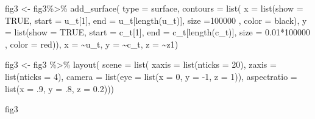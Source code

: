 \documentclass[
  us-letterpaper,
]{scrreprt}
\newenvironment{Shaded}{\begin{snugshade}}{\end{snugshade}}
\newcommand{\AttributeTok}[1]{\textcolor[rgb]{0.40,0.45,0.13}{#1}}
\newcommand{\ConstantTok}[1]{\textcolor[rgb]{0.56,0.35,0.01}{#1}}
\newcommand{\DecValTok}[1]{\textcolor[rgb]{0.68,0.00,0.00}{#1}}
\newcommand{\FloatTok}[1]{\textcolor[rgb]{0.68,0.00,0.00}{#1}}
\newcommand{\FunctionTok}[1]{\textcolor[rgb]{0.28,0.35,0.67}{#1}}
\newcommand{\NormalTok}[1]{\textcolor[rgb]{0.00,0.23,0.31}{#1}}
\newcommand{\OtherTok}[1]{\textcolor[rgb]{0.00,0.23,0.31}{#1}}
\newcommand{\SpecialCharTok}[1]{\textcolor[rgb]{0.37,0.37,0.37}{#1}}
\newcommand{\StringTok}[1]{\textcolor[rgb]{0.13,0.47,0.30}{#1}}
\theoremstyle{plain}
\theoremstyle{plain}
\theoremstyle{definition}
\theoremstyle{remark}
\begin{document}
\begin{Shaded}
\begin{Highlighting}[]
\NormalTok{fig3 }\OtherTok{\textless{}{-}}\NormalTok{ fig3}\SpecialCharTok{\%\textgreater{}\%} \FunctionTok{add\_surface}\NormalTok{(}
  \AttributeTok{type =} \StringTok{\textquotesingle{}surface\textquotesingle{}}\NormalTok{,}
  \AttributeTok{contours =} \FunctionTok{list}\NormalTok{(}
    \AttributeTok{x =} \FunctionTok{list}\NormalTok{(}\AttributeTok{show =} \ConstantTok{TRUE}\NormalTok{, }\AttributeTok{start =}\NormalTok{ u\_t[}\DecValTok{1}\NormalTok{], }
             \AttributeTok{end =}\NormalTok{ u\_t[}\FunctionTok{length}\NormalTok{(u\_t)], }\AttributeTok{size =}\DecValTok{100000}\NormalTok{ ,}
             \AttributeTok{color =} \StringTok{\textquotesingle{}black\textquotesingle{}}\NormalTok{),}
    \AttributeTok{y =} \FunctionTok{list}\NormalTok{(}\AttributeTok{show =} \ConstantTok{TRUE}\NormalTok{, }\AttributeTok{start =}\NormalTok{ c\_t[}\DecValTok{1}\NormalTok{], }
             \AttributeTok{end =}\NormalTok{ c\_t[}\FunctionTok{length}\NormalTok{(c\_t)], }
             \AttributeTok{size =} \FloatTok{0.01}\SpecialCharTok{*}\DecValTok{100000}\NormalTok{ , }\AttributeTok{color =} \StringTok{\textquotesingle{}red\textquotesingle{}}\NormalTok{)),}
  \AttributeTok{x =} \SpecialCharTok{\textasciitilde{}}\NormalTok{u\_t,}
  \AttributeTok{y =} \SpecialCharTok{\textasciitilde{}}\NormalTok{c\_t,}
  \AttributeTok{z =} \SpecialCharTok{\textasciitilde{}}\NormalTok{z1)}

\NormalTok{fig3 }\OtherTok{\textless{}{-}}\NormalTok{ fig3 }\SpecialCharTok{\%\textgreater{}\%} \FunctionTok{layout}\NormalTok{(}
  \AttributeTok{scene =} \FunctionTok{list}\NormalTok{(}
    \AttributeTok{xaxis =} \FunctionTok{list}\NormalTok{(}\AttributeTok{nticks =} \DecValTok{20}\NormalTok{),}
    \AttributeTok{zaxis =} \FunctionTok{list}\NormalTok{(}\AttributeTok{nticks =} \DecValTok{4}\NormalTok{),}
    \AttributeTok{camera =} \FunctionTok{list}\NormalTok{(}\AttributeTok{eye =} \FunctionTok{list}\NormalTok{(}\AttributeTok{x =} \DecValTok{0}\NormalTok{, }\AttributeTok{y =} \SpecialCharTok{{-}}\DecValTok{1}\NormalTok{, }\AttributeTok{z =} \DecValTok{1}\NormalTok{)),}
    \AttributeTok{aspectratio =} \FunctionTok{list}\NormalTok{(}\AttributeTok{x =}\NormalTok{ .}\DecValTok{9}\NormalTok{, }\AttributeTok{y =}\NormalTok{ .}\DecValTok{8}\NormalTok{, }\AttributeTok{z =} \FloatTok{0.2}\NormalTok{)))}


\NormalTok{fig3}
\end{Highlighting}
\end{Shaded}
\end{document}
